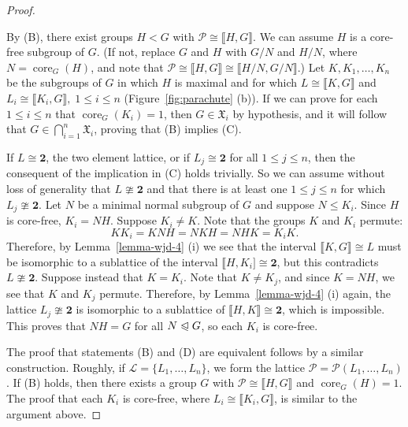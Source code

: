 \documentclass{gen-j-l}
\newcommand{\lb}{\ensuremath{\llbracket}}
\newcommand{\rb}{\ensuremath{\rrbracket}}
\newcommand{\<}{\ensuremath{\langle}}
\renewcommand{\>}{\ensuremath{\rangle}}
\theoremstyle{plain}
\theoremstyle{definition}
\theoremstyle{remark}
\numberwithin{theorem}{section}
\numberwithin{claim}{section}
\numberwithin{equation}{section}
\numberwithin{conjecture}{section}
\renewcommand{\leq}{\ensuremath{\leqslant}}
\newcommand{\subnormal}{\ensuremath{\trianglelefteqslant}}
\newcommand{\core}{\ensuremath{\operatorname{core}}}
\newcommand{\2}{\ensuremath{\mathbf{2}}}
\newcommand{\3}{\ensuremath{\mathbf{3}}}
\newcommand{\sG}{\ensuremath{\mathfrak{X}}}
\newcommand{\sL}{\ensuremath{\mathscr{L}}}
\newcommand{\sP}{\ensuremath{\mathscr{P}}}
\begin{document}
\begin{proof}
\begin{figure}[centering]
\begin{center}
{
}
\end{center}
\end{figure}
By (B), there exist groups $H <G$ with $\sP \cong \lb H,G \rb$.  We can assume $H$
is a core-free subgroup of $G$.  (If not, replace $G$ and $H$ with
$G/N$ and $H/N$, where $N=\core_G(H)$, and note that 
$\sP \cong \lb H,G \rb \cong \lb H/N,G/N \rb$.)
Let $K, K_1, \dots, K_n$ be the subgroups of $G$ in which $H$ is maximal
and for which
$L \cong \lb K, G \rb$ and $L_i \cong \lb K_i, G \rb,\; 1\leq i\leq n$ (Figure~\ref{fig:parachute} (b)).
If we can prove for each $1\leq i\leq n$ that $\core_G(K_i)=1$, then $G\in
\sG_i$ by hypothesis, and it will follow that $G \in \bigcap\limits_{i=1}^n
\sG_i$, proving that (B) implies (C). 

If $L \cong \2$, the two element lattice, or if $L_j\cong \2$ for all $1\leq
j\leq n$, then the consequent of the implication in (C) holds trivially.
So we can assume without loss of
generality that $L\ncong \2$ and that there is at least one $1\leq j\leq n$ for which
$L_j\ncong \2$. Let $N$ be a minimal normal subgroup of $G$ and suppose $N\leq
K_i$.  Since $H$ is core-free, $K_i = NH$.  
Suppose $K_i \neq K$.
Note that the groups $K$ and $K_i$ permute:
\[
K K_i = K NH = NKH = NHK = K_i K.
\]
Therefore, by Lemma~\ref{lemma-wjd-4} (i) we see that the interval $\lb K,G \rb \cong L$
must be isomorphic to a sublattice of the interval $\lb H,K_i]\cong \2$, but this
contradicts $L\ncong \2$.
Suppose instead that $K = K_i$. Note that $K \neq K_j$, and since $K=NH$, we
see that $K$ and $K_j$ permute.  Therefore, by Lemma~\ref{lemma-wjd-4} (i)
again, the lattice $L_j\ncong \2$ is isomorphic to a sublattice of $\lb H,K \rb\cong
\2$, which is impossible.  This proves that $NH = G$ for all $N\subnormal G$, so
each $K_i$ is core-free. 

The proof that statements (B) and (D) are equivalent follows by a similar
construction.  Roughly, if
$\sL = \{L_1, \dots, L_n\}$, we form  the lattice $\sP = \sP(L_1, \dots, L_n)$.
If (B) holds, then there exists a group $G$ with $\sP \cong \lb H, G \rb$ and
$\core_G(H)=1$.  The proof that each $K_i$ is core-free, where $L_i\cong \lb K_i,G \rb$, is
similar to the argument above.
\end{proof}
\end{document}

